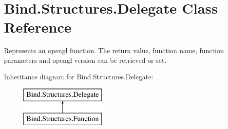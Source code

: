 \hypertarget{class_bind_1_1_structures_1_1_delegate}{
\section{Bind.Structures.Delegate Class Reference}
\label{class_bind_1_1_structures_1_1_delegate}
}


Represents an opengl function. The return value, function name, function parameters and opengl version can be retrieved or set.  


Inheritance diagram for Bind.Structures.Delegate:\begin{figure}[H]
\begin{center}
\leavevmode
\includegraphics[height=2.000000cm]{class_bind_1_1_structures_1_1_delegate}
\end{center}
\end{figure}
